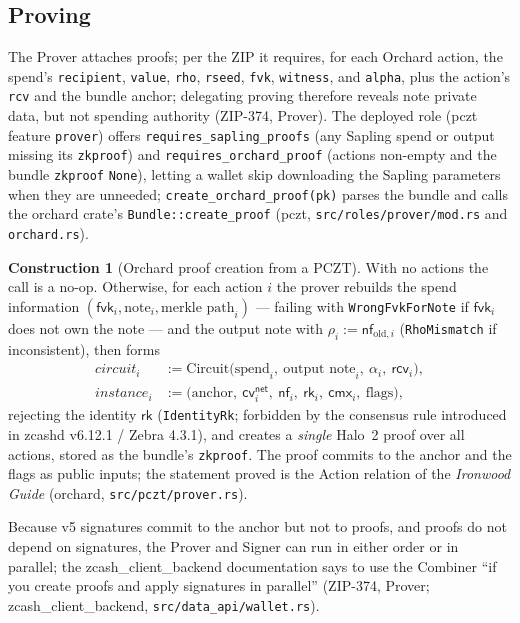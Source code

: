 \documentclass[11pt,a4paper]{article}
\theoremstyle{definition}
\newtheorem{construction}[theorem]{Construction}
\newcommand{\nfsym}{\mathsf{nf}}
\newcommand{\cmx}{\mathsf{cmx}}
\newcommand{\cvsym}{\mathsf{cv}}
\newcommand{\rk}{\mathsf{rk}}
\newcommand{\fvk}{\ensuremath{\mathsf{fvk}}}
\newcommand{\rcv}{\ensuremath{\mathsf{rcv}}}
\begin{document}
\subsection{Proving}\label{sec:pczt-prove}

The Prover attaches proofs; per the ZIP it requires, for each Orchard
action, the spend's \texttt{recipient}, \texttt{value}, \texttt{rho},
\texttt{rseed}, \texttt{fvk}, \texttt{witness}, and \texttt{alpha}, plus
the action's \texttt{rcv} and the bundle anchor; delegating proving
therefore reveals note private data, but not spending authority (ZIP-374,
Prover). The deployed role (\textsf{pczt} feature \texttt{prover}) offers
\texttt{requires\_sapling\_proofs} (any Sapling spend or output missing
its \texttt{zkproof}) and \texttt{requires\_orchard\_proof} (actions
non-empty and the bundle \texttt{zkproof} \texttt{None}), letting a
wallet skip downloading the Sapling parameters when they are unneeded;
\texttt{create\_orchard\_proof(pk)} parses the bundle and calls the
\textsf{orchard} crate's \texttt{Bundle::create\_proof} (\textsf{pczt},
\texttt{src/roles/prover/mod.rs} and \texttt{orchard.rs}).

\begin{construction}[Orchard proof creation from a PCZT]%
\label{def:pczt-proof}
With no actions the call is a no-op. Otherwise, for each action $i$ the
prover rebuilds the spend information
$(\fvk_i, \text{note}_i, \text{merkle path}_i)$ --- failing with
\texttt{WrongFvkForNote} if $\fvk_i$ does not own the note --- and the
output note with $\rho_i := \nfsym_{\mathrm{old},i}$
(\texttt{RhoMismatch} if inconsistent), then forms
\begin{align*}
\mathit{circuit}_i &:= \mathrm{Circuit}\bigl(\text{spend}_i,\
\text{output note}_i,\ \alpha_i,\ \rcv_i\bigr), \\
\mathit{instance}_i &:= \bigl(\text{anchor},\ \cvsym^{\mathsf{net}}_i,\
\nfsym_i,\ \rk_i,\ \cmx_i,\ \text{flags}\bigr),
\end{align*}
rejecting the identity $\rk$ (\texttt{IdentityRk}; forbidden by the
consensus rule introduced in \textsf{zcashd} v6.12.1 / Zebra 4.3.1), and
creates a \emph{single} Halo~2 proof over all actions, stored as the
bundle's \texttt{zkproof}. The proof commits to the anchor and the flags
as public inputs; the statement proved is the Action relation of the
\emph{Ironwood Guide} (\textsf{orchard}, \texttt{src/pczt/prover.rs}).
\end{construction}

Because v5 signatures commit to the anchor but not to proofs, and proofs
do not depend on signatures, the Prover and Signer can run in either
order or in parallel; the \textsf{zcash\_client\_backend} documentation
says to use the Combiner ``if you create proofs and apply signatures in
parallel'' (ZIP-374, Prover; \textsf{zcash\_client\_backend},
\texttt{src/data\_api/wallet.rs}).
\end{document}
